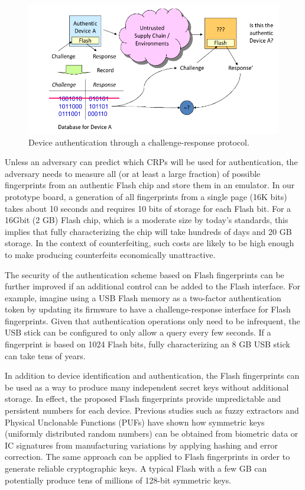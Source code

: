 \begin{figure}
\begin{center} 
\includegraphics[width=\mywidth]{figs/authentication_app.png} 
\caption{Device authentication through a challenge-response protocol.}
\label{fig:auth_app} 
\vspace{-0.1in}
\end{center} 
\end{figure} 

Unless an adversary can predict which CRPs will be used for authentication, the adversary needs to measure all (or at least a large fraction) of possible fingerprints from an authentic Flash chip and store them in an emulator. In our prototype board, a generation of all fingerprints from a single page (16K bits) takes about 10 seconds and requires 10 bits of storage for each Flash bit. For a 16Gbit (2 GB) Flash chip, which is a moderate size by today’s standards, this implies that fully characterizing the chip will take hundreds of days and 20 GB storage. In the context of counterfeiting, such costs are likely to be high enough to make producing counterfeits economically unattractive. 

The security of the authentication scheme based on Flash fingerprints can be further improved if an additional control can be added to the Flash interface. For example, imagine using a USB Flash memory as a two-factor authentication token by updating its firmware to have a challenge-response interface for Flash fingerprints. Given that authentication operations only need to be infrequent, the USB stick can be configured to only allow a query every few seconds. If a fingerprint is based on 1024 Flash bits, fully characterizing an 8 GB USB stick can take tens of years.

In addition to device identification and authentication, the Flash fingerprints can be used as a way to produce many independent secret keys without additional storage. In effect, the proposed Flash fingerprints provide unpredictable and persistent numbers for each device. Previous studies such as fuzzy extractors \cite{dodis2004fuzzy} and Physical Unclonable Functions (PUFs) \cite{suhpuf2007} have shown how symmetric keys (uniformly distributed random numbers) can be obtained from biometric data or IC signatures from manufacturing variations by applying hashing and error correction. The same approach can be applied to Flash fingerprints in order to generate reliable cryptographic keys. A typical Flash with a few GB can potentially produce tens of millions of 128-bit symmetric keys.

